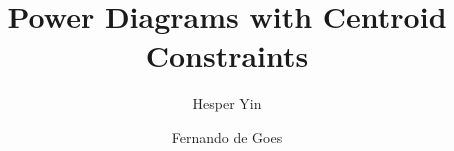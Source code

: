 \documentclass[acmtog, review, anonymous, screen]{acmart}
\theoremstyle{definition}
\theoremstyle{plain}
\begin{document}
\title{Power Diagrams with Centroid Constraints}

\author{Hesper Yin}

\author{Fernando de Goes}

\begin{abstract}
\end{abstract}

\maketitle













\appendix
\raggedbottom







% 

\end{document}
